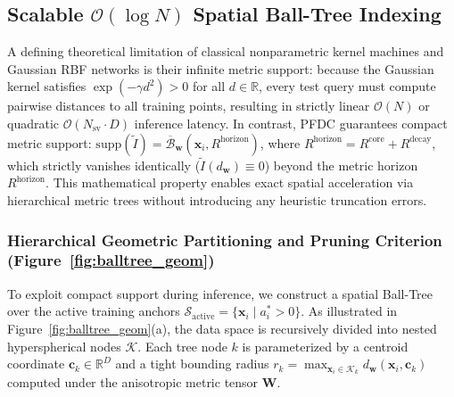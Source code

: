\documentclass[times, review, 10pt]{elsarticle}
\begin{document}
\subsection{Scalable $\mathcal{O}(\log N)$ Spatial Ball-Tree Indexing}
\label{sec:spatial_indexing}
A defining theoretical limitation of classical nonparametric kernel machines and Gaussian RBF networks is their infinite metric support: because the Gaussian kernel satisfies $\exp(-\gamma d^2) > 0$ for all $d \in \mathbb{R}$, every test query must compute pairwise distances to all training points, resulting in strictly linear $\mathcal{O}(N)$ or quadratic $\mathcal{O}(N_{\mathrm{sv}} \cdot D)$ inference latency. In contrast, PFDC guarantees compact metric support: $\mathrm{supp}(\tilde{I}) = \overline{\mathcal{B}}_{\mathbf{w}}(\mathbf{x}_i, R^{\mathrm{horizon}})$, where $R^{\mathrm{horizon}} = R^{\mathrm{core}} + R^{\mathrm{decay}}$, which strictly vanishes identically ($\tilde{I}(d_{\mathbf{w}}) \equiv 0$) beyond the metric horizon $R^{\mathrm{horizon}}$. This mathematical property enables exact spatial acceleration via hierarchical metric trees without introducing any heuristic truncation errors.

\subsubsection{Hierarchical Geometric Partitioning and Pruning Criterion (Figure~\ref{fig:balltree_geom})}
To exploit compact support during inference, we construct a spatial Ball-Tree \cite{omohundro1989five} over the active training anchors $\mathcal{S}_{\mathrm{active}} = \{\mathbf{x}_i \mid a_i^* > 0\}$. As illustrated in Figure~\ref{fig:balltree_geom}(a), the data space is recursively divided into nested hyperspherical nodes $\mathcal{K}$. Each tree node $k$ is parameterized by a centroid coordinate $\mathbf{c}_k \in \mathbb{R}^D$ and a tight bounding radius $r_k = \max_{\mathbf{x}_i \in \mathcal{K}_k} d_{\mathbf{w}}(\mathbf{x}_i, \mathbf{c}_k)$ computed under the anisotropic metric tensor $\mathbf{W}$.
\end{document}
